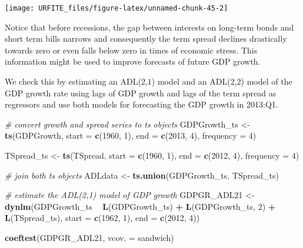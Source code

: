 \documentclass[]{book}
\newenvironment{Shaded}{\begin{snugshade}}{\end{snugshade}}
\newcommand{\KeywordTok}[1]{\textcolor[rgb]{0.13,0.29,0.53}{\textbf{#1}}}
\newcommand{\DataTypeTok}[1]{\textcolor[rgb]{0.13,0.29,0.53}{#1}}
\newcommand{\DecValTok}[1]{\textcolor[rgb]{0.00,0.00,0.81}{#1}}
\newcommand{\StringTok}[1]{\textcolor[rgb]{0.31,0.60,0.02}{#1}}
\newcommand{\CommentTok}[1]{\textcolor[rgb]{0.56,0.35,0.01}{\textit{#1}}}
\newcommand{\OperatorTok}[1]{\textcolor[rgb]{0.81,0.36,0.00}{\textbf{#1}}}
\newcommand{\NormalTok}[1]{#1}
\theoremstyle{definition}
\theoremstyle{definition}
\theoremstyle{definition}
\theoremstyle{remark}
\begin{document}
\begin{center}\texttt{[image: URFITE\_files/figure-latex/unnamed-chunk-45-2]} \end{center}

Notice that before recessions, the gap between interests on long-term
bonds and short term bills narrows and consequently the term spread
declines drastically towards zero or even falls below zero in times of
economic stress. This information might be used to improve forecasts of
future GDP growth.

We check this by estimating an ADL(\(2\),\(1\)) model and an
ADL(\(2\),\(2\)) model of the GDP growth rate using lags of GDP growth
and lags of the term spread as regressors and use both models for
forecasting the GDP growth in 2013:Q1.

\begin{Shaded}
\begin{Highlighting}[]
\CommentTok{# convert growth and spread series to ts objects}
\NormalTok{GDPGrowth_ts <-}\StringTok{ }\KeywordTok{ts}\NormalTok{(GDPGrowth, }
                  \DataTypeTok{start =} \KeywordTok{c}\NormalTok{(}\DecValTok{1960}\NormalTok{, }\DecValTok{1}\NormalTok{), }
                  \DataTypeTok{end =} \KeywordTok{c}\NormalTok{(}\DecValTok{2013}\NormalTok{, }\DecValTok{4}\NormalTok{), }
                  \DataTypeTok{frequency =} \DecValTok{4}\NormalTok{)}

\NormalTok{TSpread_ts <-}\StringTok{ }\KeywordTok{ts}\NormalTok{(TSpread, }
                \DataTypeTok{start =} \KeywordTok{c}\NormalTok{(}\DecValTok{1960}\NormalTok{, }\DecValTok{1}\NormalTok{), }
                \DataTypeTok{end =} \KeywordTok{c}\NormalTok{(}\DecValTok{2012}\NormalTok{, }\DecValTok{4}\NormalTok{), }
                \DataTypeTok{frequency =} \DecValTok{4}\NormalTok{)}

\CommentTok{# join both ts objects}
\NormalTok{ADLdata <-}\StringTok{ }\KeywordTok{ts.union}\NormalTok{(GDPGrowth_ts, TSpread_ts)}
\end{Highlighting}
\end{Shaded}

\begin{Shaded}
\begin{Highlighting}[]
\CommentTok{# estimate the ADL(2,1) model of GDP growth}
\NormalTok{GDPGR_ADL21 <-}\StringTok{ }\KeywordTok{dynlm}\NormalTok{(GDPGrowth_ts }\OperatorTok{~}\StringTok{ }\KeywordTok{L}\NormalTok{(GDPGrowth_ts) }\OperatorTok{+}\StringTok{ }\KeywordTok{L}\NormalTok{(GDPGrowth_ts, }\DecValTok{2}\NormalTok{) }\OperatorTok{+}\StringTok{ }\KeywordTok{L}\NormalTok{(TSpread_ts), }
      \DataTypeTok{start =} \KeywordTok{c}\NormalTok{(}\DecValTok{1962}\NormalTok{, }\DecValTok{1}\NormalTok{), }\DataTypeTok{end =} \KeywordTok{c}\NormalTok{(}\DecValTok{2012}\NormalTok{, }\DecValTok{4}\NormalTok{))}

\KeywordTok{coeftest}\NormalTok{(GDPGR_ADL21, }\DataTypeTok{vcov. =}\NormalTok{ sandwich)}
\end{Highlighting}
\end{Shaded}
\end{document}
